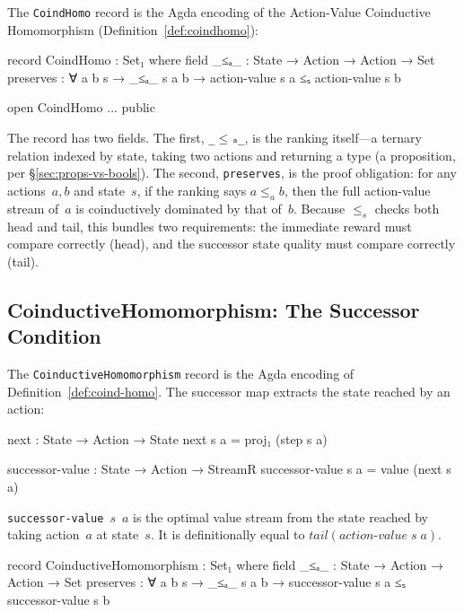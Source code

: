 \documentclass[9pt,a4paper]{article}
\theoremstyle{plain}
\theoremstyle{definition}
\theoremstyle{remark}
\begin{document}
The \texttt{CoindHomo} record is the Agda encoding of the Action-Value Coinductive Homomorphism (Definition~\ref{def:coindhomo}):

\begin{code}
  record CoindHomo : Set₁ where
    field
      _≤ₐ_      : State → Action → Action → Set
      preserves : ∀ a b s → _≤ₐ_ s a b →
                  action-value s a ≤ₛ action-value s b

  open CoindHomo {{...}} public
\end{code}

\noindent The record has two fields.  The first, \texttt{\_$\le$ₐ\_}, is the ranking itself---a ternary relation indexed by state, taking two actions and returning a type (a proposition, per \S\ref{sec:props-vs-bools}).  The second, \texttt{preserves}, is the proof obligation: for any actions~$a, b$ and state~$s$, if the ranking says $a \le_a b$, then the full action-value stream of~$a$ is coinductively dominated by that of~$b$.  Because $\le_s$ checks both head and tail, this bundles two requirements: the immediate reward must compare correctly (head), and the successor state quality must compare correctly (tail).

\subsection{CoinductiveHomomorphism: The Successor Condition}

The \texttt{CoinductiveHomomorphism} record is the Agda encoding of Definition~\ref{def:coind-homo}.  The successor map extracts the state reached by an action:

\begin{code}
  next : State → Action → State
  next s a = proj₁ (step s a)

  successor-value : State → Action → StreamR
  successor-value s a = value (next s a)
\end{code}

\noindent \texttt{successor-value}~$s$~$a$ is the optimal value stream from the state reached by taking action~$a$ at state~$s$.  It is definitionally equal to $\mathit{tail}(\mathit{action\text{-}value}\;s\;a)$.

\begin{code}
  record CoinductiveHomomorphism : Set₁ where
    field
      _≤ₐ_      : State → Action → Action → Set
      preserves : ∀ a b s → _≤ₐ_ s a b →
                  successor-value s a ≤ₛ successor-value s b
\end{code}
\end{document}

